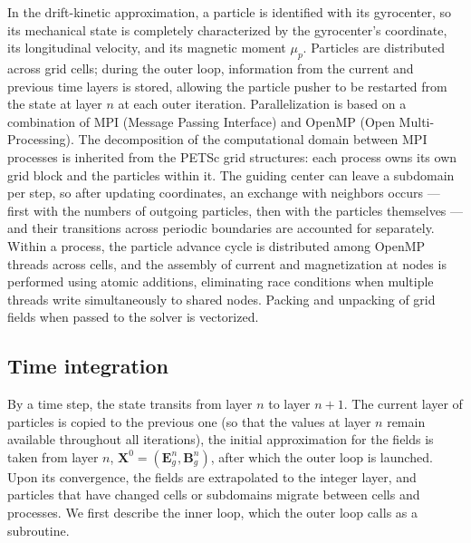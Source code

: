 \documentclass[final,3p]{elsarticle}
\begin{document}
In the drift-kinetic approximation, a particle is identified with its gyrocenter, so its mechanical state is completely characterized by the gyrocenter's coordinate, its longitudinal velocity, and its magnetic moment $\mu_p$. Particles are distributed across grid cells; during the outer loop, information from the current and previous time layers is stored, allowing the particle pusher to be restarted from the state at layer $n$ at each outer iteration. Parallelization is based on a combination of MPI (Message Passing Interface) and OpenMP (Open Multi-Processing). The decomposition of the computational domain between MPI processes is inherited from the PETSc grid structures: each process owns its own grid block and the particles within it. The guiding center can leave a subdomain per step, so after updating coordinates, an exchange with neighbors occurs --- first with the numbers of outgoing particles, then with the particles themselves --- and their transitions across periodic boundaries are accounted for separately. Within a process, the particle advance cycle is distributed among OpenMP threads across cells, and the assembly of current and magnetization at nodes is performed using atomic additions, eliminating race conditions when multiple threads write simultaneously to shared nodes. Packing and unpacking of grid fields when passed to the solver is vectorized.

 
\subsection{Time integration}\label{imp:step}

By a time step, the state transits from layer $n$ to layer $n+1$. The current layer of particles is copied to the previous one (so that the values at layer $n$ remain available throughout all iterations), the initial approximation for the fields is taken from layer $n$, $\mathbf{X}^0=(\mathbf{E}_g^n,\mathbf{B}_g^n)$, after which the outer loop is launched. Upon its convergence, the fields are extrapolated to the integer layer, and particles that have changed cells or subdomains migrate between cells and processes. We first describe the inner loop, which the outer loop calls as a subroutine.



 
\end{document}
